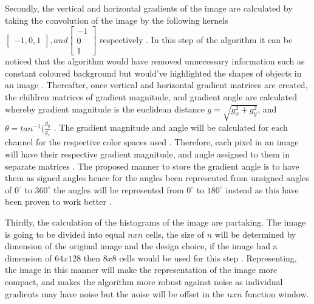 \documentclass[conference]{IEEEtran}
\begin{document}
Secondly, the vertical and horizontal gradients of the image are calculated by taking the convolution of the image by the following kernels $ \begin{bmatrix}
-1, 0, 1
\end{bmatrix}, and 
\begin{bmatrix}
-1 \\ 0 \\ 1
\end{bmatrix}$ respectively \cite{b12} \cite{b11}. In this step of the algorithm it can be noticed that the algorithm would have removed unnecessary information such as constant coloured background but would've highlighted the shapes of objects in an image \cite{b12}. Thereafter, once vertical and horizontal gradient matrices are created, the children matrices of gradient magnitude, and gradient angle are calculated whereby gradient magnitude is the euclidean distance $ g = \sqrt{g_{x}^{2} + g_{y}^{2}}$, and $\theta = tan^{-1}(\frac{g_{y}}{g_{x}}$ \cite{b12} \cite{b11} \cite{b6}. The gradient magnitude and angle will be calculated for each channel for the respective color spaces used \cite{b12} \cite{b11}. Therefore, each pixel in an image will have their respective gradient magnitude, and angle assigned to them in separate matrices \cite{b12}. The proposed manner to store the gradient angle is to have them as signed angles hence for the angles been represented from unsigned angles of $0^{\circ}$ to $360^{\circ}$ the angles will be represented from $0^{\circ}$ to $180^{\circ}$ instead as this have been proven to work better \cite{b12} \cite{b11}.  \par

Thirdly, the calculation of the histograms of the image are partaking. The image is going to be divided into equal $nxn$ cells, the size of $n$ will be determined by dimension of the original image and the design  choice, if the image had a dimension of $64x128$ then $8x8$ cells would be used for this step \cite{b12}. Representing, the image in this manner will make the representation of the image more compact, and makes the algorithm more robust against noise as individual gradients may have noise but the noise will be offset in the $nxn$ function window.\par
\end{document}
